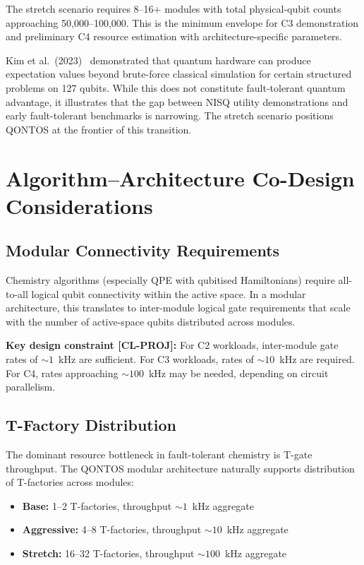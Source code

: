 \documentclass[conference]{IEEEtran}
\begin{document}
The stretch scenario requires 8--16+ modules with total physical-qubit counts
approaching 50,000--100,000. This is the minimum envelope for C3 demonstration and
preliminary C4 resource estimation with architecture-specific parameters.

Kim et al.\ (2023)~\cite{kim2023} demonstrated that quantum hardware can produce expectation values
beyond brute-force classical simulation for certain structured problems on 127 qubits.
While this does not constitute fault-tolerant quantum advantage, it illustrates that
the gap between NISQ utility demonstrations and early fault-tolerant benchmarks is
narrowing. The stretch scenario positions QONTOS at the frontier of this transition.

\section{Algorithm--Architecture Co-Design Considerations}

\subsection{Modular Connectivity Requirements}

Chemistry algorithms (especially QPE with qubitised Hamiltonians) require all-to-all
logical qubit connectivity within the active space. In a modular architecture, this
translates to inter-module logical gate requirements that scale with the number of
active-space qubits distributed across modules.

\textbf{Key design constraint [CL-PROJ]:} For C2 workloads, inter-module gate rates of
${\sim}1$~kHz are sufficient. For C3 workloads, rates of ${\sim}10$~kHz are required. For C4, rates
approaching ${\sim}100$~kHz may be needed, depending on circuit parallelism.

\subsection{T-Factory Distribution}

The dominant resource bottleneck in fault-tolerant chemistry is T-gate throughput. The
QONTOS modular architecture naturally supports distribution of T-factories across
modules:

\begin{itemize}[leftmargin=*]
\item \textbf{Base:} 1--2 T-factories, throughput ${\sim}1$~kHz aggregate
\item \textbf{Aggressive:} 4--8 T-factories, throughput ${\sim}10$~kHz aggregate
\item \textbf{Stretch:} 16--32 T-factories, throughput ${\sim}100$~kHz aggregate
\end{itemize}
\end{document}
